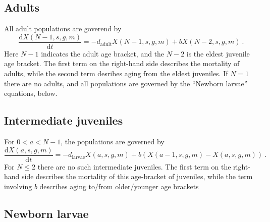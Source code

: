 \documentclass[11pt,a4paper]{article}
\begin{document}
\subsection{Adults}

All adult populations are goverend by
\begin{equation}
\frac{\mathrm{d}X(N-1, s, g, m)}{\mathrm{d} t} = -d_{\mathrm{adult}}X(N-1, s, g, m) + b X(N-2, s, g, m) \ .
\end{equation}
Here $N-1$ indicates the adult age bracket, and the $N-2$ is the eldest juvenile age bracket.  The first term on the right-hand side describes the mortality of adults, while the second term desribes aging from the eldest juveniles.  If $N=1$ there are no adults, and all populations are governed by the ``Newborn larvae'' equations, below.

\subsection{Intermediate juveniles}

For $0<a<N-1$, the populations are governed by
\begin{equation}
\frac{\mathrm{d}X(a, s, g, m)}{\mathrm{d} t} = -d_{\mathrm{larvae}}X(a, s, g, m) + b \left(X(a-1, s, g, m) - X(a, s, g, m) \right) \ .
\end{equation}
For $N\leq 2$ there are no such intermediate juveniles.  The first term on the right-hand side describes the mortality of this age-bracket of juveniles, while the term involving $b$ describes aging to/from older/younger age brackets

\subsection{Newborn larvae}
\end{document}
